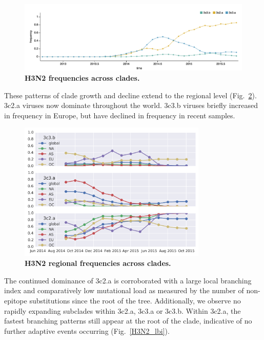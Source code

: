 \documentclass[11pt,oneside,letterpaper]{article}
\begin{document}
\begin{figure}[h!]
	\centering		
	\includegraphics[width=1.0\textwidth]{../figures/sep-2015/H3N2_frequencies.png}
	\caption{\textbf{H3N2 frequencies across clades.} 
	}
	\label{H3N2_frequencies}
\end{figure}

These patterns of clade growth and decline extend to the regional level (Fig.~\ref{H3N2_HA1-159_frequencies}). 3c2.a viruses now dominate throughout the world. 3c3.b viruses briefly increased in frequency in Europe, but have declined in frequency in recent samples.

\begin{figure}[h!]
	\centering		
	\includegraphics[width=0.8\textwidth]{../figures/sep-2015/H3N2_HA1-159_frequencies.png}
	\caption{\textbf{H3N2 regional frequencies across clades.} 
	}
	\label{H3N2_HA1-159_frequencies}
\end{figure}

The continued dominance of 3c2.a is corroborated with a large local branching index and comparatively low mutational load as measured by the number of non-epitope substitutions since the root of the tree. Additionally, we observe no rapidly expanding subclades within 3c2.a, 3c3.a or 3c3.b. Within 3c2.a, the fastest branching patterns still appear at the root of the clade, indicative of no further adaptive events occurring (Fig.~\ref{H3N2_lbi}).
\end{document}
